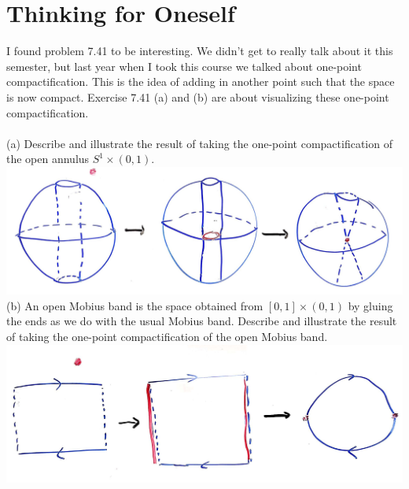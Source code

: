 \documentclass[12pt]{article}
\newcommand{\1}{^{-1}}
\begin{document}
	\section{Thinking for Oneself}
	I found problem 7.41 to be interesting. We didn't get to really talk about it this semester, but last year when I took this course we talked about one-point compactification. This is the idea of adding in another point such that the space is now compact. Exercise 7.41 (a) and (b) are about visualizing these one-point compactification.\\
	\\
	(a) Describe and illustrate the result of taking the one-point compactification of the open annulus $S^1\times(0,1)$.\\
	\includegraphics[scale=.28]{7-41a.jpg}
	\\
	(b) An open Mobius band is the space obtained from $[0,1]\times(0,1)$ by gluing the ends as we do with the usual Mobius band.  Describe and illustrate the result of taking the one-point compactification of the open Mobius band. \\
	\includegraphics[scale=.3]{7-41b.jpg}
	\\
	 
	
\end{document}
